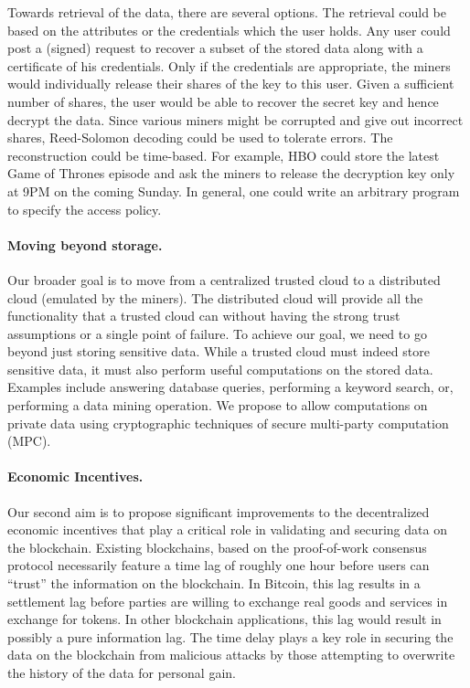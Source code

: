 \documentclass[runningheads, 12pt]{article}
\begin{document}
Towards retrieval of the data, there are several options. The retrieval could be based on the attributes or the credentials which the user holds. Any user could post a (signed) request to recover a subset of the stored data along with a certificate of his credentials. Only if the credentials are appropriate, the miners would individually release their shares of the key to this user. Given a sufficient number of shares, the user would be able to recover the secret key and hence decrypt the data. Since various miners might be corrupted and give out incorrect shares, Reed-Solomon decoding could be used to tolerate errors. The reconstruction could be time-based. For example, HBO could store the latest Game of Thrones episode and ask the miners to release the decryption key only at 9PM on the coming Sunday. In general, one could write an arbitrary program to specify the access policy.

\paragraph{Moving beyond storage.} Our broader goal is to move from a centralized trusted cloud to a distributed cloud (emulated by the miners). The distributed cloud will provide all the functionality that a trusted cloud can without having the strong trust assumptions or a single point of failure.  To achieve our goal, we need to go beyond just storing sensitive data. While a trusted cloud must indeed store sensitive data, it must also perform useful computations on the stored data. Examples include answering database queries, performing a keyword search, or, performing a data mining operation. We propose to allow computations on private data using cryptographic techniques of secure multi-party computation (MPC).


\paragraph{Economic Incentives.} Our second aim is to propose significant improvements to the decentralized economic incentives that play a critical role in validating and securing data on the blockchain. Existing blockchains, based on the proof-of-work consensus protocol necessarily feature a time lag of roughly one hour before users can ``trust'' the information on the blockchain. In Bitcoin, this lag results in a settlement lag before parties are willing to exchange real goods and services in exchange for tokens. In other blockchain applications, this lag would result in possibly a pure information lag. The time delay plays a key role in securing the data on the blockchain from malicious attacks by those attempting to overwrite the history of the data for personal gain.
\end{document}
